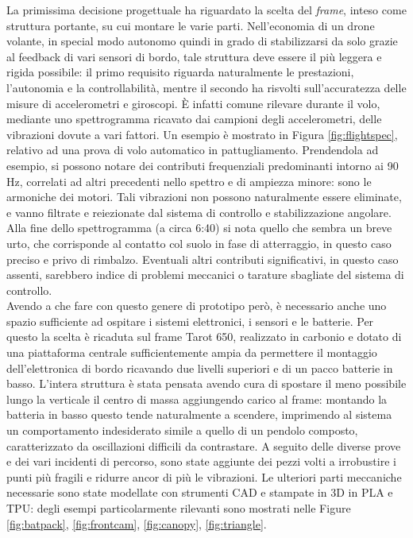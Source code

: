 \indent La primissima decisione progettuale ha riguardato la scelta del \emph{frame}, inteso come struttura portante, su cui montare le varie parti. Nell'economia di un drone volante, in special modo autonomo quindi in grado di stabilizzarsi da solo grazie al feedback di vari sensori di bordo, tale struttura deve essere il più leggera e rigida possibile: il primo requisito riguarda naturalmente le prestazioni, l'autonomia e la controllabilità, mentre il secondo ha risvolti sull'accuratezza delle misure di accelerometri e giroscopi. È infatti comune rilevare durante il volo, mediante uno spettrogramma ricavato dai campioni degli accelerometri, delle vibrazioni dovute a vari fattori. Un esempio è mostrato in Figura \ref{fig:flightspec}, relativo ad una prova di volo automatico in pattugliamento. Prendendola ad esempio, si possono notare dei contributi frequenziali predominanti intorno ai 90 Hz, correlati ad altri precedenti nello spettro e di ampiezza minore: sono le armoniche dei motori. Tali vibrazioni non possono naturalmente essere eliminate, e vanno filtrate e reiezionate dal sistema di controllo e stabilizzazione angolare. Alla fine dello spettrogramma (a circa 6:40) si nota quello che sembra un breve urto, che corrisponde al contatto col suolo in fase di atterraggio, in questo caso preciso e privo di rimbalzo. Eventuali altri contributi significativi, in questo caso assenti, sarebbero indice di problemi meccanici o tarature sbagliate del sistema di controllo.\\
Avendo a che fare con questo genere di prototipo però, è necessario anche uno spazio sufficiente ad ospitare i sistemi elettronici, i sensori e le batterie. Per questo la scelta è ricaduta sul frame Tarot 650, realizzato in carbonio e dotato di una piattaforma centrale sufficientemente ampia da permettere il montaggio dell'elettronica di bordo ricavando due livelli superiori e di un pacco batterie in basso. L'intera struttura è stata pensata avendo cura di spostare il meno possibile lungo la verticale il centro di massa aggiungendo carico al frame: montando la batteria in basso questo tende naturalmente a scendere, imprimendo al sistema un comportamento indesiderato simile a quello di un pendolo composto, caratterizzato da oscillazioni difficili da contrastare. A seguito delle diverse prove e dei vari incidenti di percorso, sono state aggiunte dei pezzi volti a irrobustire i punti più fragili e ridurre ancor di più le vibrazioni. Le ulteriori parti meccaniche necessarie sono state modellate con strumenti CAD e stampate in 3D in PLA e TPU: degli esempi particolarmente rilevanti sono mostrati nelle Figure \ref{fig:batpack}, \ref{fig:frontcam}, \ref{fig:canopy}, \ref{fig:triangle}.\\
